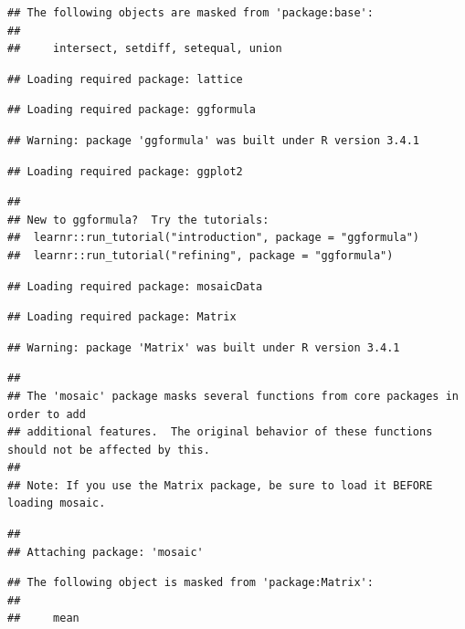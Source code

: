 \documentclass[10pt,ngerman,onside]{article}
\begin{document}
\begin{verbatim}
## The following objects are masked from 'package:base':
## 
##     intersect, setdiff, setequal, union
\end{verbatim}

\begin{verbatim}
## Loading required package: lattice
\end{verbatim}

\begin{verbatim}
## Loading required package: ggformula
\end{verbatim}

\begin{verbatim}
## Warning: package 'ggformula' was built under R version 3.4.1
\end{verbatim}

\begin{verbatim}
## Loading required package: ggplot2
\end{verbatim}

\begin{verbatim}
## 
## New to ggformula?  Try the tutorials: 
##  learnr::run_tutorial("introduction", package = "ggformula")
##  learnr::run_tutorial("refining", package = "ggformula")
\end{verbatim}

\begin{verbatim}
## Loading required package: mosaicData
\end{verbatim}

\begin{verbatim}
## Loading required package: Matrix
\end{verbatim}

\begin{verbatim}
## Warning: package 'Matrix' was built under R version 3.4.1
\end{verbatim}

\begin{verbatim}
## 
## The 'mosaic' package masks several functions from core packages in order to add 
## additional features.  The original behavior of these functions should not be affected by this.
## 
## Note: If you use the Matrix package, be sure to load it BEFORE loading mosaic.
\end{verbatim}

\begin{verbatim}
## 
## Attaching package: 'mosaic'
\end{verbatim}

\begin{verbatim}
## The following object is masked from 'package:Matrix':
## 
##     mean
\end{verbatim}
\end{document}
